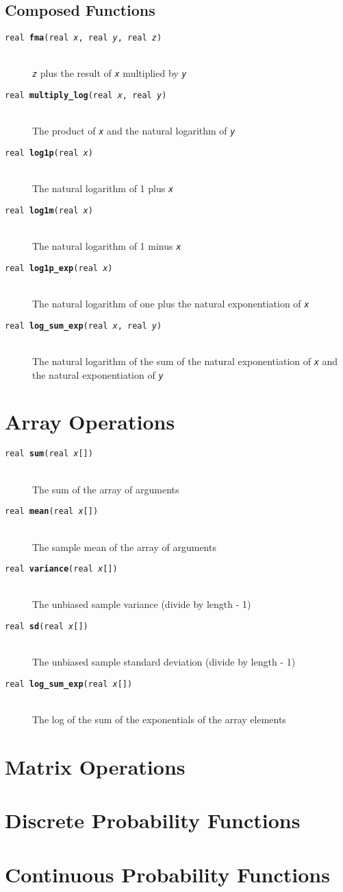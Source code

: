 \documentclass[10pt]{report}
\newcommand{\fitem}[4]{\item[{\tt #1 {\bfseries #2}(#3)}]\mbox{ } \\[4pt] #4}
\newcommand{\farg}[1]{{\tt\slshape #1}}
\begin{document}
\section{Composed Functions}

\begin{description}
%
\fitem{real}{fma}{real \farg{x}, 
               real \farg{y},
               real \farg{z}}{
\farg{z} plus the result of \farg{x} multiplied by \farg{y}}
%
\fitem{real}{multiply\_log}{real \farg{x}, real \farg{y}}{ 
The product of \farg{x} and the natural logarithm of \farg{y}}
%
\fitem{real}{log1p}{real \farg{x}}{
The natural logarithm of 1 plus \farg{x}}
%
\fitem{real}{log1m}{real \farg{x}}{
The natural logarithm of 1 minus \farg{x}}
%
\fitem{real}{log1p\_exp}{real \farg{x}}{ 
The natural logarithm of one plus the natural exponentiation of
\farg{x}}
%
\fitem{real}{log\_sum\_exp}{real \farg{x}, real \farg{y}}{ 
The natural logarithm of the sum of the natural exponentiation
of \farg{x} and the natural exponentiation of \farg{y}}
%
\end{description}




\chapter{Array Operations}


\begin{description}
\fitem{real}{sum}{real \farg{x}[]}
The sum of the array of arguments
%
\fitem{real}{mean}{real \farg{x}[]}
The sample mean of the array of arguments
%
\fitem{real}{variance}{real \farg{x}[]}
The unbiased sample variance (divide by length - 1)
%
\fitem{real}{sd}{real \farg{x}[]}
The unbiased sample standard deviation (divide by length - 1)
%
\fitem{real}{log\_sum\_exp}{real \farg{x}[]}
The log of the sum of the exponentials of the array elements
\end{description}

\chapter{Matrix Operations}

\chapter{Discrete Probability Functions}

\chapter{Continuous Probability Functions} 
\end{document}
